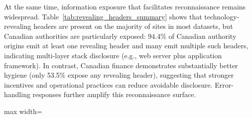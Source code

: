 \documentclass[a4paper,fleqn]{cas-sc}
\begin{document}
    At the same time, information exposure that facilitates reconnaissance remains widespread. 
    Table~\ref{tab:revealing_headers_summary} shows that technology-revealing headers are present on the majority of sites in most datasets, but Canadian authorities are particularly exposed: 94.4\% of Canadian authority origins emit at least one revealing header and many emit multiple such headers, indicating multi-layer stack disclosure (e.g., web server plus application framework). 
    In contrast, Canadian finance demonstrates substantially better hygiene (only 53.5\% expose any revealing header), suggesting that stronger incentives and operational practices can reduce avoidable disclosure. 
    Error-handling responses further amplify this reconnaissance surface. 
    
    \begin{table}[t]
      \caption{Distribution of technology-revealing headers by dataset.}
      \label{tab:revealing_headers_summary}
      \centering
      \scriptsize
      \setlength{\tabcolsep}{3pt}
      \renewcommand{\arraystretch}{1.15}
    
      \begin{adjustbox}{max width=\columnwidth}
      \end{adjustbox}
    \end{table}
    
\end{document}
